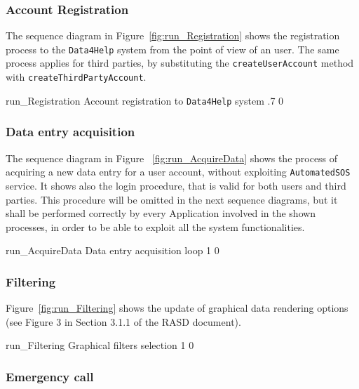 \documentclass[../DD0.tex]{subfiles}
\begin{document}
    \subsubsection{Account Registration}
    \label{sec:runregistration}

      The sequence diagram in Figure~\ref{fig:run_Registration} shows the registration process to the \texttt{Data4Help} system from the point of view of an user. The same process applies for third parties, by substituting the \texttt{createUserAccount} method with \texttt{createThirdPartyAccount}.

      \fetchUML
        {run_Registration}
        {Account registration to \texttt{Data4Help} system}
        {.7}           %
        {0}           %

    \clearpage
    \subsubsection{Data entry acquisition}
    \label{sec:userdata}

      The sequence diagram in Figure ~\ref{fig:run_AcquireData} shows the process of acquiring a new data entry for a user account, without exploiting \texttt{AutomatedSOS} service. It shows also the login procedure, that is valid for both users and third parties. This procedure will be omitted in the next sequence diagrams, but it shall be performed correctly by every Application involved in the shown processes, in order to be able to exploit all the system functionalities.

      \fetchUML
        {run_AcquireData}
        {Data entry acquisition loop}
        {1}           %
        {0}           %

    \clearpage
    \subsubsection{Filtering}
    \label{sec:filtering}

      Figure~\ref{fig:run_Filtering} shows the update of graphical data rendering options (see Figure 3 in Section 3.1.1 of the RASD document).

      \fetchUML
        {run_Filtering}
        {Graphical filters selection}
        {1}           %
        {0}           %

    \clearpage
    \subsubsection{Emergency call}
    \label{sec:automatedSOS}
\end{document}
